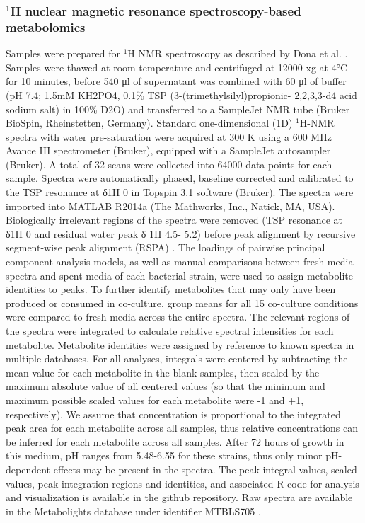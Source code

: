 \documentclass[11pt,twocolumn,notitlepage,openany,twoside]{book}
\begin{document}
\begin{refsection}
\subsubsection{$^1\!$H nuclear magnetic resonance spectroscopy-based metabolomics}

Samples were prepared for $^1\!$H NMR spectroscopy as described by Dona et al. \cite{Dona2014-og}. Samples were thawed at room temperature and centrifuged at 12000 xg at 4°C for 10 minutes, before 540 μl of supernatant was combined with 60 μl of buffer (pH 7.4; 1.5mM KH2PO4, 0.1\% TSP (3-(trimethylsilyl)propionic- 2,2,3,3-d4 acid sodium salt) in 100\% D2O) and transferred to a SampleJet NMR tube (Bruker BioSpin, Rheinstetten, Germany). Standard one-dimensional (1D) $^1\!$H-NMR spectra with water pre-saturation were acquired at 300 K using a 600 MHz Avance III spectrometer (Bruker), equipped with a SampleJet autosampler (Bruker). A total of 32 scans were collected into 64000 data points for each sample. Spectra were automatically phased, baseline corrected and calibrated to the TSP resonance at δ1H 0 in Topspin 3.1 software (Bruker). The spectra were imported into MATLAB R2014a (The Mathworks, Inc., Natick, MA, USA). Biologically irrelevant regions of the spectra were removed (TSP resonance at δ1H 0 and residual water peak δ 1H 4.5- 5.2) before peak alignment by recursive segment-wise peak alignment (RSPA) \cite{Veselkov2009-ha}. The loadings of pairwise principal component analysis models, as well as manual comparisons between fresh media spectra and spent media of each bacterial strain, were used to assign metabolite identities to peaks. To further identify metabolites that may only have been produced or consumed in co-culture, group means for all 15 co-culture conditions were compared to fresh media across the entire spectra. The relevant regions of the spectra were integrated to calculate relative spectral intensities for each metabolite. Metabolite identities were assigned by reference to known spectra in multiple databases. For all analyses, integrals were centered by subtracting the mean value for each metabolite in the blank samples, then scaled by the maximum absolute value of all centered values (so that the minimum and maximum possible scaled values for each metabolite were -1 and +1, respectively). We assume that concentration is proportional to the integrated peak area for each metabolite across all samples, thus relative concentrations can be inferred for each metabolite across all samples. After 72 hours of growth in this medium, pH ranges from 5.48-6.55 for these strains, thus only minor pH-dependent effects may be present in the spectra. The peak integral values, scaled values, peak integration regions and identities, and associated R code for analysis and visualization is available in the github repository. Raw spectra are available in the Metabolights database under identifier MTBLS705 \cite{Kale2016-aa}.


\end{refsection}
\end{document}
